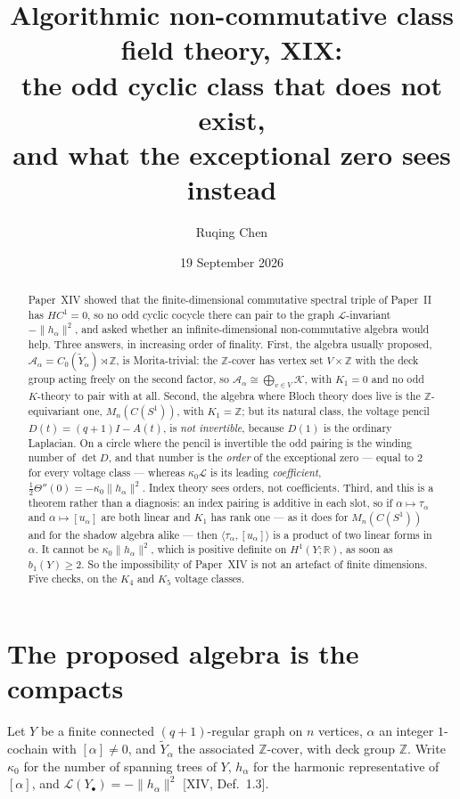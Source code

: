 \documentclass[11pt]{amsart}
\title[Algorithmic non-commutative class field theory, XIX]
{Algorithmic non-commutative class field theory, XIX:\\
the odd cyclic class that does not exist,\\ and what the exceptional zero sees instead}
\author{Ruqing Chen}
\date{19 September 2026}
\numberwithin{equation}{section}
\theoremstyle{definition}
\theoremstyle{remark}
\newcommand{\Z}{\mathbb{Z}}
\newcommand{\R}{\mathbb{R}}
\newcommand{\cA}{\mathcal{A}}
\newcommand{\cK}{\mathcal{K}}
\newcommand{\cL}{\mathcal{L}}
\newcommand{\Yt}{\widetilde Y_\alpha}
\begin{document}
\begin{abstract}
Paper~XIV showed that the finite-dimensional commutative spectral triple of Paper~II has
$HC^1=0$, so no odd cyclic cocycle there can pair to the graph $\cL$-invariant
$-\|h_\alpha\|^2$, and asked whether an infinite-dimensional non-commutative algebra
would help. Three answers, in increasing order of finality. First, the algebra usually
proposed, $\cA_\alpha=C_0(\Yt)\rtimes\Z$, is Morita-trivial: the $\Z$-cover has vertex set
$V\times\Z$ with the deck group acting freely on the second factor, so
$\cA_\alpha\cong\bigoplus_{v\in V}\cK$, with $K_1=0$ and no odd $K$-theory to pair with at
all. Second, the algebra where Bloch theory does live is the $\Z$-equivariant one,
$M_n(C(S^1))$, with $K_1=\Z$; but its natural class, the voltage pencil
$D(t)=(q+1)I-A(t)$, is \emph{not invertible}, because $D(1)$ is the ordinary Laplacian.
On a circle where the pencil is invertible the odd pairing is the winding number of
$\det D$, and that number is the \emph{order} of the exceptional zero --- equal to $2$ for
every voltage class --- whereas $\kappa_0\cL$ is its leading \emph{coefficient},
$\tfrac12\Theta''(0)=-\kappa_0\|h_\alpha\|^2$. Index theory sees orders, not
coefficients. Third, and this is a theorem rather than a diagnosis: an index pairing is
additive in each slot, so if $\alpha\mapsto\tau_\alpha$ and $\alpha\mapsto[u_\alpha]$ are
both linear and $K_1$ has rank one --- as it does for $M_n(C(S^1))$ and for the shadow
algebra alike --- then $\langle\tau_\alpha,[u_\alpha]\rangle$ is a product of two linear
forms in $\alpha$. It cannot be $\kappa_0\|h_\alpha\|^2$, which is positive definite on
$H^1(Y;\R)$, as soon as $b_1(Y)\ge2$. So the impossibility of Paper~XIV is not an artefact
of finite dimensions. Five checks, on the $K_4$ and $K_5$ voltage classes.
\end{abstract}

\maketitle

\section{The proposed algebra is the compacts}\label{sec:crossed}

Let $Y$ be a finite connected $(q+1)$-regular graph on $n$ vertices, $\alpha$ an integer
$1$-cochain with $[\alpha]\ne0$, and $\Yt$ the associated $\Z$-cover, with deck group
$\Z$. Write $\kappa_0$ for the number of spanning trees of $Y$, $h_\alpha$ for the
harmonic representative of $[\alpha]$, and $\cL(Y_\bullet)=-\|h_\alpha\|^2$
[XIV, Def.~1.3].
\end{document}
